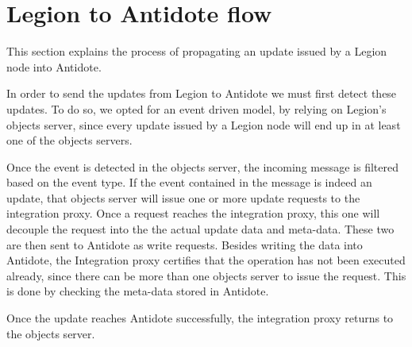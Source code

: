 \section{Legion to Antidote flow}
\label{sec:legion_to_antidote_flow}
This section explains the process of propagating an update issued by a Legion node into Antidote.\par
	In order to send the updates from Legion to Antidote we must first detect these updates. To do so, we opted for an event driven model, by relying on Legion's objects server, since every update issued by a Legion node will end up in at least one of the objects servers.\par
	Once the event is detected in the objects server, the incoming message is filtered based on the event type. If the event contained in the message is indeed an update, that objects server will issue one or more update requests to the integration proxy. Once a request reaches the integration proxy, this one will decouple the request into the the actual update data and meta-data. These two are then sent to Antidote as write requests. Besides writing the data into Antidote, the Integration proxy certifies that the operation has not been executed already, since there can be more than one objects server to issue the request. This is done by checking the meta-data stored in Antidote.\par
	Once the update reaches Antidote successfully, the integration proxy returns to the objects server.

